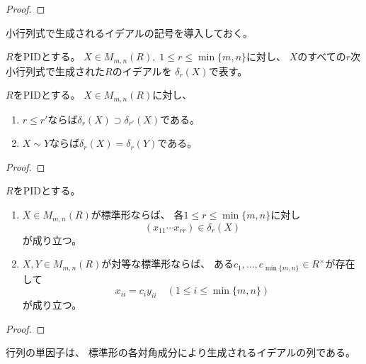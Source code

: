 \documentclass[report]{jlreq}
\begin{document}
\begin{proof}
    \TODO{}
\end{proof}

小行列式で生成されるイデアルの記号を導入しておく。

\begin{definition}
    $R$をPIDとする。
    $X \in M_{m, n}(R), \; 1 \le r \le \min\{m, n\}$に対し、
    $X$のすべての$r$次小行列式で生成された$R$のイデアルを
    $\delta_r(X)$で表す。
\end{definition}

\begin{theorem}
    $R$をPIDとする。
    $X \in M_{m, n}(R)$に対し、
    \begin{enumerate}
        \item $r \le r'$ならば$\delta_r(X) \supset \delta_{r'}(X)$である。
        \item $X \sim Y$ならば$\delta_r(X) = \delta_r(Y)$である。
    \end{enumerate}
\end{theorem}

\begin{proof}
    \TODO{}
\end{proof}

\begin{theorem}[単因子論の基本定理2]
    $R$をPIDとする。
    \begin{enumerate}
        \item $X \in M_{m, n}(R)$が標準形ならば、
            各$1 \le r \le \min\{m, n\}$に対し
            \begin{equation}
                (x_{11} \cdots x_{rr}) \in \delta_r(X)
            \end{equation}
            が成り立つ。
        \item $X, Y \in M_{m, n}(R)$が対等な標準形ならば、
            ある$c_1, \dots, c_{\min\{m, n\}} \in R^\times$が存在して
            \begin{equation}
                x_{ii} = c_i y_{ii}
                    \quad
                    (1 \le i \le \min\{m, n\})
            \end{equation}
            が成り立つ。
    \end{enumerate}
\end{theorem}

\begin{proof}
    \TODO{}
\end{proof}

行列の単因子は、
標準形の各対角成分により生成されるイデアルの列である。
\end{document}
